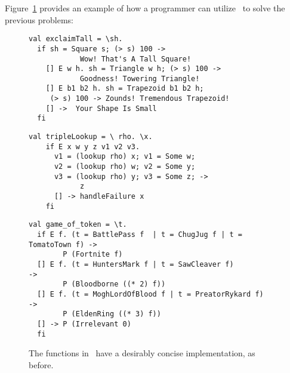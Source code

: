 \documentclass[manuscript,screen,review, 12pt, nonacm]{acmart}
\begin{document}
    Figure~\ref{fig:vminusfuncs} provides an example of how a programmer can
    utilize \VMinus\ to solve the previous problems: 
    
    
    \begin{figure}[ht] 
      \begin{minipage}[h]{0.54\linewidth}
        \vmlst 
        \begin{lstlisting}[numbers=none, basicstyle=\tiny, xleftmargin=.2em,
          showstringspaces=false,
          frame=single]
val exclaimTall = \sh.
  if sh = Square s; (> s) 100 -> 
            Wow! That's A Tall Square!  
    [] E w h. sh = Triangle w h; (> s) 100 ->
            Goodness! Towering Triangle!
    [] E b1 b2 h. sh = Trapezoid b1 b2 h; 
     (> s) 100 -> Zounds! Tremendous Trapezoid!
    [] ->  Your Shape Is Small
  fi 
  \end{lstlisting}
          \label{fig:vmexclaimtall} 
      \end{minipage}%
      \begin{minipage}[h]{0.5\linewidth}
        \vmlst 
        \begin{lstlisting}[numbers=none, basicstyle=\tiny, xleftmargin=2em,
                      frame=single]
  val tripleLookup = \ rho. \x.
    if E x w y z v1 v2 v3. 
      v1 = (lookup rho) x; v1 = Some w; 
      v2 = (lookup rho) w; v2 = Some y; 
      v3 = (lookup rho) y; v3 = Some z; -> 
            z 
      [] -> handleFailure x
    fi 
   \end{lstlisting}
            \label{fig:vmtriplelookup} 
        \vspace{4ex}
      \end{minipage} 
      \begin{minipage}[h]{\linewidth}
        \vmlst 
        \begin{lstlisting}[numbers=none, basicstyle=\tiny, xleftmargin=9em,
          showstringspaces=false,
          frame=single]
val game_of_token = \t. 
  if E f. (t = BattlePass f  | t = ChugJug f | t = TomatoTown f) -> 
        P (Fortnite f)
  [] E f. (t = HuntersMark f | t = SawCleaver f)                 -> 
        P (Bloodborne ((* 2) f))
  [] E f. (t = MoghLordOfBlood f | t = PreatorRykard f)          -> 
        P (EldenRing ((* 3) f))
  [] -> P (Irrelevant 0)
  fi 
\end{lstlisting}
          \label{fig:vmgot}
      \vspace{4ex}
      \end{minipage}%
      \caption{The functions in \VMinus\ have a desirably concise
      implementation, as before.}
  \label{fig:vminusfuncs}
    \end{figure}   
\end{document}
